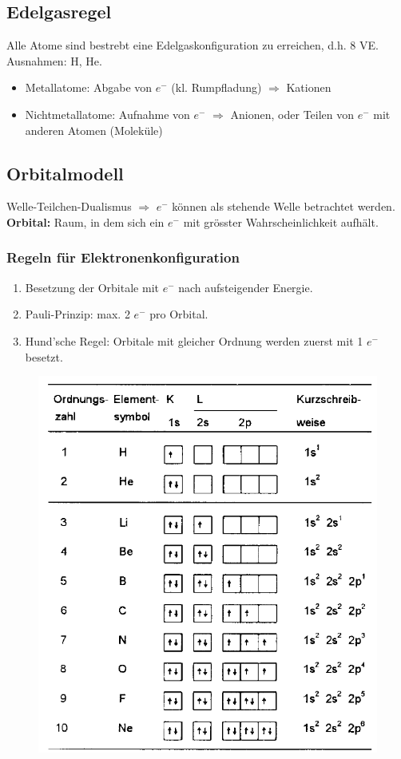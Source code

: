 \subsection{Edelgasregel}
Alle Atome sind bestrebt eine Edelgaskonfiguration zu erreichen, d.h. 8 VE. Ausnahmen: H, He.

\begin{itemize}
	\item Metallatome: Abgabe von $e^-$ (kl. Rumpfladung) $\Rightarrow$ Kationen
	\item Nichtmetallatome: Aufnahme von $e^-$ $\Rightarrow$ Anionen, oder Teilen von $e^-$ mit anderen Atomen (Moleküle)
\end{itemize}

\subsection{Orbitalmodell}
Welle-Teilchen-Dualismus $\Rightarrow$ $e^-$ können als stehende Welle betrachtet werden. \\
\textbf{Orbital:} Raum, in dem sich ein $e^-$ mit grösster Wahrscheinlichkeit aufhält. 

\subsubsection{Regeln für Elektronenkonfiguration}
\begin{enumerate}[nolistsep]
	\item Besetzung der Orbitale mit $e^-$ nach aufsteigender Energie. 
	\item Pauli-Prinzip: max. 2 $e^-$ pro Orbital. 
	\item Hund'sche Regel: Orbitale mit gleicher Ordnung werden zuerst mit 1 $e^-$ besetzt. 
\end{enumerate}

\begin{figure}[htbp]
	\centering
	\includegraphics[width=0.75\linewidth]{images/2_Konfiguration_Orbitale.png}
\end{figure}

